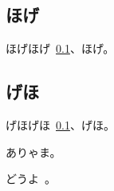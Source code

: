﻿\documentclass[a4j]{jsarticle}
\begin{document}
\setcounter{section}{1}
\subsection{ほげ}\label{sec:hoge}
ほげほげ~\ref{sec:hoge}、ほげ。
\subsection{げほ}\label{sec:geho}
げほげほ~\ref{sec:hoge}、げほ。\par
ありゃま。\par
どうよ~\pageref{sec:hoge}。
\end{document}
